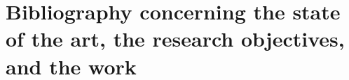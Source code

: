 \documentclass{scrartcl}
\begin{document}
%
%

\section{Bibliography concerning the state of the art, the research objectives, and the work}
\end{document}
